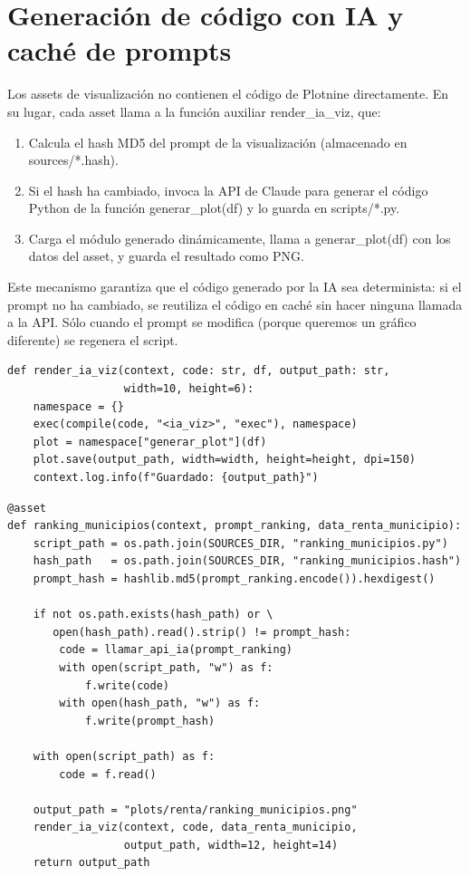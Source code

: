 \documentclass[spanish,a4paper,12pt,oneside]{extreport}
\begin{document}
\section{Generación de código con IA y caché de prompts}

Los assets de visualización no contienen el código de Plotnine directamente. En su lugar, cada asset llama a la función auxiliar render\_ia\_viz, que:

\begin{enumerate}
  \item Calcula el hash MD5 del prompt de la visualización (almacenado en sources/*.hash).
  \item Si el hash ha cambiado, invoca la API de Claude para generar el código Python de la función generar\_plot(df) y lo guarda en scripts/*.py.
  \item Carga el módulo generado dinámicamente, llama a generar\_plot(df) con los datos del asset, y guarda el resultado como PNG.
\end{enumerate}

Este mecanismo garantiza que el código generado por la IA sea determinista: si el prompt no ha cambiado, se reutiliza el código en caché sin hacer ninguna llamada a la API. Sólo cuando el prompt se modifica (porque queremos un gráfico diferente) se regenera el script.

\begin{lstlisting}[caption={Función auxiliar de renderizado con caché de prompts.}]
def render_ia_viz(context, code: str, df, output_path: str,
                  width=10, height=6):
    namespace = {}
    exec(compile(code, "<ia_viz>", "exec"), namespace)
    plot = namespace["generar_plot"](df)
    plot.save(output_path, width=width, height=height, dpi=150)
    context.log.info(f"Guardado: {output_path}")
\end{lstlisting}

\begin{lstlisting}[caption={Patrón de asset con caché de prompt hash.}]
@asset
def ranking_municipios(context, prompt_ranking, data_renta_municipio):
    script_path = os.path.join(SOURCES_DIR, "ranking_municipios.py")
    hash_path   = os.path.join(SOURCES_DIR, "ranking_municipios.hash")
    prompt_hash = hashlib.md5(prompt_ranking.encode()).hexdigest()

    if not os.path.exists(hash_path) or \
       open(hash_path).read().strip() != prompt_hash:
        code = llamar_api_ia(prompt_ranking)
        with open(script_path, "w") as f:
            f.write(code)
        with open(hash_path, "w") as f:
            f.write(prompt_hash)

    with open(script_path) as f:
        code = f.read()

    output_path = "plots/renta/ranking_municipios.png"
    render_ia_viz(context, code, data_renta_municipio,
                  output_path, width=12, height=14)
    return output_path
\end{lstlisting}
\end{document}
